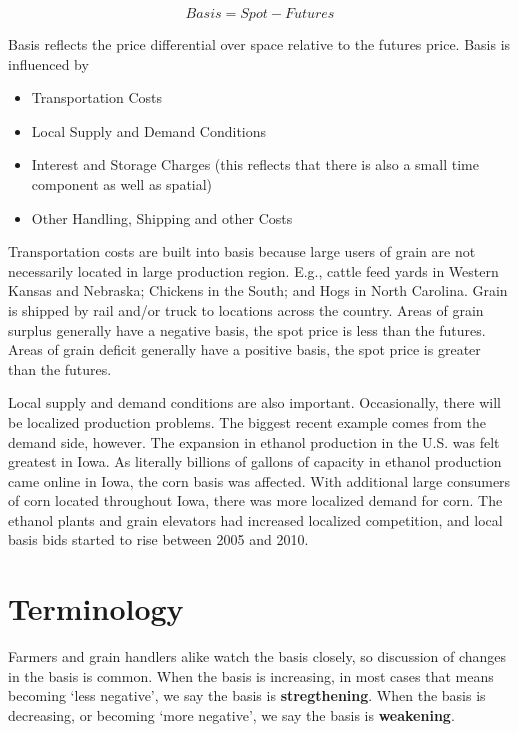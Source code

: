 \documentclass[
  letterpaper,
  DIV=11,
  numbers=noendperiod]{scrreprt}
\providecommand{\tightlist}{%
  \setlength{\itemsep}{0pt}\setlength{\parskip}{0pt}}\usepackage{longtable,booktabs,array}
\begin{document}
\[Basis = Spot - Futures\]

Basis reflects the price differential over space relative to the futures
price. Basis is influenced by

\begin{itemize}
\tightlist
\item
  Transportation Costs
\item
  Local Supply and Demand Conditions
\item
  Interest and Storage Charges (this reflects that there is also a small
  time component as well as spatial)
\item
  Other Handling, Shipping and other Costs
\end{itemize}

Transportation costs are built into basis because large users of grain
are not necessarily located in large production region. E.g., cattle
feed yards in Western Kansas and Nebraska; Chickens in the South; and
Hogs in North Carolina. Grain is shipped by rail and/or truck to
locations across the country. Areas of grain surplus generally have a
negative basis, the spot price is less than the futures. Areas of grain
deficit generally have a positive basis, the spot price is greater than
the futures.

Local supply and demand conditions are also important. Occasionally,
there will be localized production problems. The biggest recent example
comes from the demand side, however. The expansion in ethanol production
in the U.S. was felt greatest in Iowa. As literally billions of gallons
of capacity in ethanol production came online in Iowa, the corn basis
was affected. With additional large consumers of corn located throughout
Iowa, there was more localized demand for corn. The ethanol plants and
grain elevators had increased localized competition, and local basis
bids started to rise between 2005 and 2010.

\hypertarget{terminology}{%
\section{Terminology}\label{terminology}}

Farmers and grain handlers alike watch the basis closely, so discussion
of changes in the basis is common. When the basis is increasing, in most
cases that means becoming `less negative', we say the basis is
\textbf{stregthening}. When the basis is decreasing, or becoming `more
negative', we say the basis is \textbf{weakening}.
\end{document}
